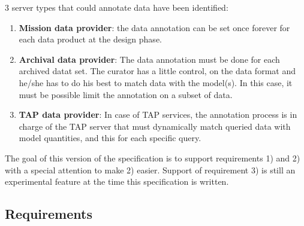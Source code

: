 \documentclass[11pt,a4paper]{ivoa}
\begin{document}
3 server types that could annotate data have been identified:
\begin{enumerate}
   \item \textbf{Mission data provider}: the data annotation can be set once forever for each data product at the design phase.
   \item \textbf{Archival data provider}: The data annotation must be done for each archived datat set. 
           The curator has a little control, on the data format and he/she has to do his best to match data with the model(s).
           In this case, it must be possible limit the annotation on a subset of data.
   \item \textbf{TAP data provider}: In case of TAP services, the annotation process is in charge of the TAP server that must dynamically match queried data with model quantities, and this for each specific query.
\end{enumerate}

The goal of this version of the specification is to support requirements 1) and 2) with a special attention to make 2) easier. 
Support of requirement 3) is still an experimental feature at the time this specification is written.


\subsection{Requirements}
\end{document}
